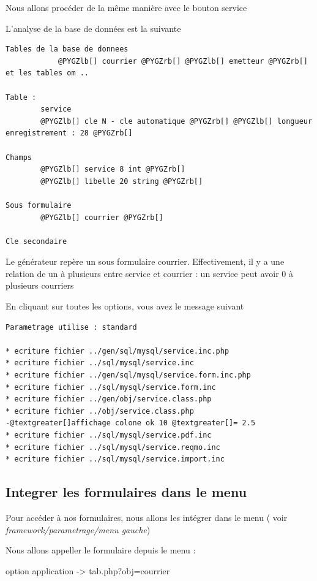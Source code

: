 \documentclass[letterpaper,10pt,french]{manual}
\begin{document}
Nous allons procéder de la même manière avec le bouton service

L'analyse de la base de données est la suivante

\begin{Verbatim}[commandchars=@\[\]]
Tables de la base de donnees
            @PYGZlb[] courrier @PYGZrb[] @PYGZlb[] emetteur @PYGZrb[] et les tables om ..

Table :
        service
        @PYGZlb[] cle N - cle automatique @PYGZrb[] @PYGZlb[] longueur enregistrement : 28 @PYGZrb[]

Champs
        @PYGZlb[] service 8 int @PYGZrb[]
        @PYGZlb[] libelle 20 string @PYGZrb[]

Sous formulaire
        @PYGZlb[] courrier @PYGZrb[]

Cle secondaire
\end{Verbatim}

Le générateur repère un sous formulaire courrier.
Effectivement, il y a une relation de un à plusieurs entre service et courrier :
un service peut avoir 0 à plusieurs courriers

En cliquant sur toutes les options, vous avez le message suivant

\begin{Verbatim}[commandchars=@\[\]]
Parametrage utilise : standard

* ecriture fichier ../gen/sql/mysql/service.inc.php
* ecriture fichier ../sql/mysql/service.inc
* ecriture fichier ../gen/sql/mysql/service.form.inc.php
* ecriture fichier ../sql/mysql/service.form.inc
* ecriture fichier ../gen/obj/service.class.php
* ecriture fichier ../obj/service.class.php
-@textgreater[]affichage colone ok 10 @textgreater[]= 2.5
* ecriture fichier ../sql/mysql/service.pdf.inc
* ecriture fichier ../sql/mysql/service.reqmo.inc
* ecriture fichier ../sql/mysql/service.import.inc
\end{Verbatim}


\subsection{Integrer les formulaires dans le menu}

Pour accéder à nos formulaires, nous allons les intégrer dans le menu
( voir \emph{framework/parametrage/menu gauche})

Nous allons appeller le formulaire depuis le menu :

option application -\textgreater{} tab.php?obj=courrier
\end{document}
